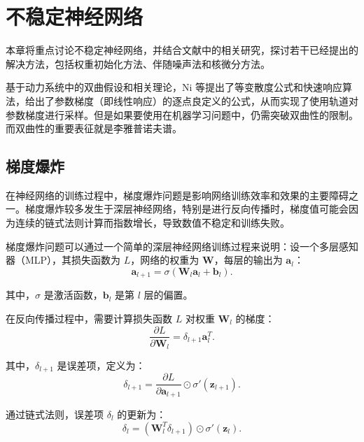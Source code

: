 
\chapter{不稳定神经网络}

本章将重点讨论不稳定神经网络，并结合文献中的相关研究，探讨若干已经提出的解决方法，包括权重初始化方法、伴随噪声法和核微分方法。

基于动力系统中的双曲假设和相关理论，Ni 等提出了等变散度公式和快速响应算法，给出了参数梯度（即线性响应）的逐点良定义的公式，从而实现了使用轨道对参数梯度进行采样\cite{ni2023recursive}\cite{ni2023fast}\cite{ni2020fast}。但是如果要使用在机器学习问题中，仍需突破双曲性的限制。而双曲性的重要表征就是李雅普诺夫谱。

\section{梯度爆炸}

在神经网络的训练过程中，梯度爆炸问题是影响网络训练效率和效果的主要障碍之一。梯度爆炸较多发生于深层神经网络，特别是进行反向传播时，梯度值可能会因为连续的链式法则计算而指数增长，导致数值不稳定和训练失败。

梯度爆炸问题可以通过一个简单的深层神经网络训练过程来说明：设一个多层感知器（MLP），其损失函数为 \( L \)，网络的权重为 \(\mathbf{W}\)，每层的输出为 \(\mathbf{a}_l\)：
\begin{equation}
  \mathbf{a}_{l+1} = \sigma(\mathbf{W}_l \mathbf{a}_l + \mathbf{b}_l).
\end{equation}

其中，\(\sigma\) 是激活函数，\(\mathbf{b}_l\) 是第 \(l\) 层的偏置。

在反向传播过程中，需要计算损失函数 \(L\) 对权重 \(\mathbf{W}_l\) 的梯度：
\begin{equation}
  \frac{\partial L}{\partial \mathbf{W}_l} = \delta_{l+1} \mathbf{a}_l^T.
 \end{equation}

其中，\(\delta_{l+1}\) 是误差项，定义为：
\begin{equation}
  \delta_{l+1} = \frac{\partial L}{\partial \mathbf{a}_{l+1}} \odot \sigma'(\mathbf{z}_{l+1}).
 \end{equation}

通过链式法则，误差项 \(\delta_l\) 的更新为：
\begin{equation}
  \delta_l = (\mathbf{W}_l^T \delta_{l+1}) \odot \sigma'(\mathbf{z}_l).
\end{equation}

